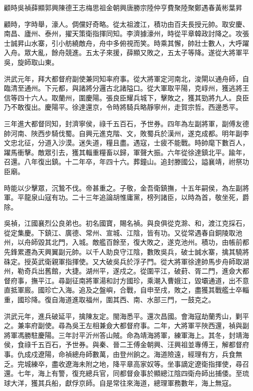 
\begin{pinyinscope}
顧時吳禎薛顯郭興陳德王志梅思祖金朝興唐勝宗陸仲亨費聚陸聚鄭遇春黃彬葉昇

顧時，字時舉，濠人。倜儻好奇略。從太祖渡江，積功由百夫長授元帥。取安慶、南昌、廬州、泰州，擢天策衛指揮同知。李濟據濠州，時從平章韓政討降之。攻張士誠昇山水寨，引小舫繞敵舟，舟中多俯視而笑。時乘其懈，帥壯士數人，大呼躍入舟。眾大亂，餘舟競進。五太子來援，薛顯又敗之，五太子等降。遂從大將軍平吳，旋師取山東。

洪武元年，拜大都督府副使兼同知率府事。從大將軍定河南北，浚閘以通舟師，自臨清至通州。下元都，與諸將分邏古北諸隘口。從大軍取平陽，克崞州，獲逃將王信等四十六人。取蘭州，圍慶陽。張良臣耀兵城下，擊敗之，獲其勁將九人。良臣乃不敢復出。慶陽平。徐達還京，令時將騎兵略靜寧州，走賀宗哲。西邊悉平。

三年進大都督同知，封濟寧侯，祿千五百石，予世券。四年為左副將軍，副傅友德帥河南、陜西步騎伐蜀。自興元進克階、文，敗蜀兵於漢州，遂克成都。明年副李文忠北征，分道入沙漠。迷失道，糧且盡。遇寇，士疲不能戰。時帥麾下數百人，躍馬衝擊。敵眾引去，獲其輜重糧畜以歸，軍聲大振。六年從徐達鎮北平。踰年，召還。八年復出鎮。十二年卒，年四十六。葬鐘山。追封滕國公，謚襄靖，祔祭功臣廟。

時能以少擊眾，沉鷙不伐。帝甚重之。子敬，金吾衛鎮撫，十五年嗣侯，為左副將軍。平龍泉山寇有功。二十三年追論胡惟庸黨，榜列諸臣，以時為首，敬坐死，爵除。

吳禎，江國襄烈公良弟也。初名國寶，賜名禎。與良俱從克滁、和，渡江克採石，從定集慶。下鎮江、廣德、常州、宣城、江陰，皆有功。又從常遇春自銅陵取池州，以舟師毀其北門，入城。敵艦百餘至，復大敗之，遂克池州。積功，由帳前都先鋒累遷為天興翼副元帥。以千人助良守江陰，數敗吳兵，破士誠水寨，擒其驍將硃定。授英武衛親軍指揮使。又大破吳兵於浮子門。從大將軍徐達帥馬步舟師取湖州，勒奇兵出舊館，大捷。湖州平，遂戍之。從圍平江，破葑、胥二門，進僉大都督府事，撫平江。尋副征南將軍湯和討方國珍，乘潮入曹娥江，毀壩通道，出不意直抵軍廄。國珍亡入海。追及之盤嶼，合戰，自申至戌，敗之，盡獲其戰艦士卒輜重，國珍降。復自海道進取福州，圍其西、南、水部三門，一鼓克之。

洪武元年，進兵破延平，擒陳友定。閩海悉平。還次昌國。會海寇劫蘭秀山，剿平之。兼率府副使。尋為吳王左相兼僉大都督府事。二年，大將軍平陜西還，禎與副將軍馮勝駐慶陽。三年討平沂州答山賊。命為靖海將軍，練軍海上。其冬，封靖海侯，食祿千五百石，予世券。與秦、晉二王傅金朝興、汪興祖並專傅王，解都督府事。仇成戍遼陽，命禎總舟師數萬，由登州餉之。海道險遠，經理有方，兵食無乏。完城練卒，盡收遼海未附之地，降平章高家奴等。坐事謫定遼衛指揮使，尋召還。七年，海上有警，復充總兵官，同都督僉事於顯總江陰四衛舟師出捕倭。至琉球大洋，獲其兵船，獻俘京師。自是常往來海道，總理軍務數年，海上無寇。


\end{pinyinscope}
